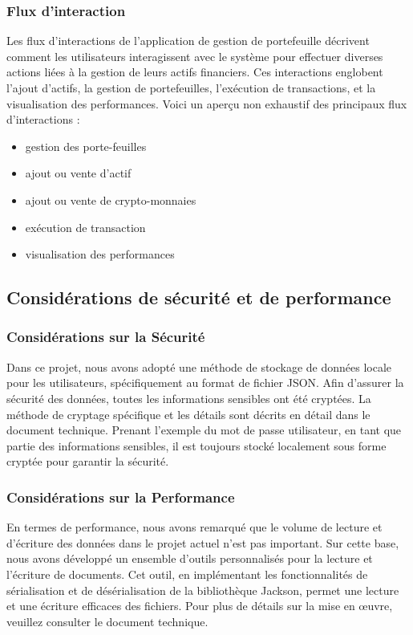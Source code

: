 \documentclass{article}
\begin{document}
\subsubsection{Flux d'interaction}

Les flux d'interactions de l'application de gestion de portefeuille décrivent comment les utilisateurs interagissent avec le système pour effectuer diverses actions liées à la gestion de leurs actifs financiers. Ces interactions englobent l'ajout d'actifs, la gestion de portefeuilles, l'exécution de transactions, et la visualisation des performances. Voici un aperçu non exhaustif des principaux flux d'interactions :

\begin{itemize}
    \item gestion des porte-feuilles
    \item ajout ou vente d'actif
    \item ajout ou vente de crypto-monnaies
    \item exécution de transaction
    \item visualisation des performances
    
\end{itemize}
\subsection{Considérations de sécurité et de performance}
\subsubsection{Considérations sur la Sécurité}
Dans ce projet, nous avons adopté une méthode de stockage de données locale pour les utilisateurs, spécifiquement au format de fichier JSON. Afin d'assurer la sécurité des données, toutes les informations sensibles ont été cryptées. La méthode de cryptage spécifique et les détails sont décrits en détail dans le document technique. Prenant l'exemple du mot de passe utilisateur, en tant que partie des informations sensibles, il est toujours stocké localement sous forme cryptée pour garantir la sécurité.
\subsubsection{Considérations sur la Performance}
En termes de performance, nous avons remarqué que le volume de lecture et d'écriture des données dans le projet actuel n'est pas important. Sur cette base, nous avons développé un ensemble d'outils personnalisés pour la lecture et l'écriture de documents. Cet outil, en implémentant les fonctionnalités de sérialisation et de désérialisation de la bibliothèque Jackson, permet une lecture et une écriture efficaces des fichiers. Pour plus de détails sur la mise en œuvre, veuillez consulter le document technique.
\end{document}
